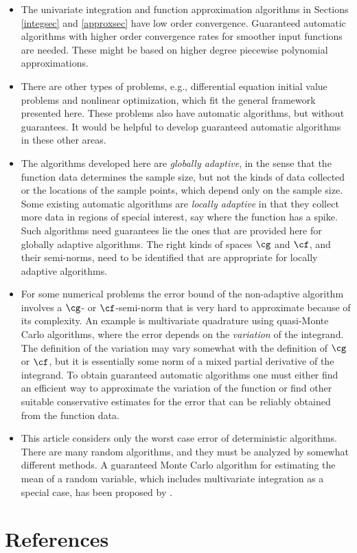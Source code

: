 \documentclass[]{elsarticle}
\theoremstyle{definition}
\theoremstyle{remark}
\begin{document}
\begin{itemize}

\item The univariate integration and function approximation algorithms in Sections \ref{integsec} and \ref{approxsec} have low order convergence.  Guaranteed automatic algorithms with higher order convergence rates for smoother input functions are needed.  These might be based on higher degree piecewise polynomial approximations.

\item There are other types of problems, e.g., differential equation initial value problems and nonlinear optimization, which fit the general framework presented here.  These problems also have automatic algorithms, but without guarantees.  It would be helpful to develop guaranteed automatic algorithms in these other areas.

\item The algorithms developed here are \emph{globally adaptive}, in the sense that the function data determines the sample size, but not the kinds of data collected or the locations of the sample points, which depend only on the sample size.  Some existing automatic algorithms are \emph{locally adaptive} in that they collect more data in regions of special interest, say where the function has a spike.  Such algorithms need guarantees lie the ones that are provided here for globally adaptive algorithms.  The right kinds of spaces $\cg$ and $\cf$, and their semi-norms, need to be identified that are appropriate for locally adaptive algorithms.

\item For some numerical problems the error bound of the non-adaptive algorithm involves a $\cg$- or $\cf$-semi-norm that is very hard to approximate because of its complexity.  An example is multivariate quadrature using quasi-Monte Carlo algorithms, where the error depends on the \emph{variation} of the integrand.  The definition of the variation may vary somewhat with the definition of $\cg$ or $\cf$, but it is essentially some norm of a mixed partial derivative of the integrand.  To obtain guaranteed automatic algorithms one must either find an efficient way to approximate the variation of the function or find other suitable conservative estimates for the error that can be reliably obtained from the function data.  

\item This article considers only the worst case error of deterministic algorithms.  There are many random algorithms, and they must be analyzed by somewhat different methods.  A guaranteed Monte Carlo algorithm for estimating the mean of a random variable, which includes multivariate integration as a special case, has been proposed by \cite{HicEtal14a}.

\end{itemize}

\section*{References}

%

\end{document}
